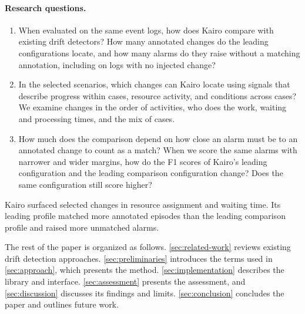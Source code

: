

\paragraph{Research questions.}
\begin{enumerate}[label=\textbf{RQ\Alph*.},ref=RQ\Alph*]
  \item\label{rq:comparison} When evaluated on the same event logs, how does Kairo compare with existing drift detectors? How many annotated changes do the leading configurations locate, and how many alarms do they raise without a matching annotation, including on logs with no injected change?
  \item\label{rq:scenarios} In the selected scenarios, which changes can Kairo locate using signals that describe progress within cases, resource activity, and conditions across cases? We examine changes in the order of activities, who does the work, waiting and processing times, and the mix of cases.
  \item\label{rq:margin} How much does the comparison depend on how close an alarm must be to an annotated change to count as a match? When we score the same alarms with narrower and wider margins, how do the F1 scores of Kairo's leading configuration and the leading comparison configuration change? Does the same configuration still score higher?
\end{enumerate}

Kairo surfaced selected changes in resource assignment and waiting time. Its leading profile matched more annotated episodes than the leading comparison profile and raised more unmatched alarms.

The rest of the paper is organized as follows. \autoref{sec:related-work} reviews existing drift detection approaches. \autoref{sec:preliminaries} introduces the terms used in \autoref{sec:approach}, which presents the method. \autoref{sec:implementation} describes the library and interface. \autoref{sec:assessment} presents the assessment, and \autoref{sec:discussion} discusses its findings and limits. \autoref{sec:conclusion} concludes the paper and outlines future work.
